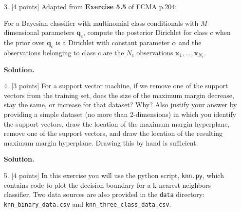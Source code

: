 \documentclass[10pt]{article}
\begin{document}
\begin{itemize}
\item[3.]  [4 points]  
Adapted from {\bf Exercise 5.5} of FCMA p.204:

For a Bayesian classifier with multinomial class-conditionals with $M$-dimensional parameters $\mathbf{q}_c$, compute the posterior Dirichlet for class $c$ when the prior over $\mathbf{q}_c$ is a Dirichlet with constant parameter $\alpha$ and the observations belonging to class $c$ are the $N_c$ observations $\mathbf{x}_1, ..., \mathbf{x}_{N_c}$.

{\bf Solution.} %







\item[4.]  [3 points]
For a support vector machine, if we remove one of the support vectors from the training set, does the size of the maximum margin decrease, stay the same, or increase for that dataset?  Why?  Also justify your answer by providing a simple dataset (no more than 2-dimensions) in which you identify the support vectors, draw the location of the maximum margin hyperplane, remove one of the support vectors, and draw the location of the resulting maximum margin hyperplane.  Drawing this by hand is sufficient.

{\bf Solution.}




\item[5.]  [4 points]
In this exercise you will use the python script, {\tt knn.py}, which contains code to plot the decision boundary for a k-nearest neighbors classifier.  Two data sources are also provided in the {\tt data} directory: {\tt knn\_binary\_data.csv} and {\tt knn\_three\_class\_data.csv}.


\end{itemize}
\end{document}
